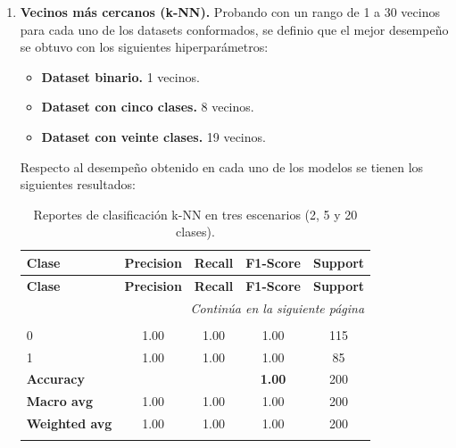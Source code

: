 \documentclass[12pt,a4paper]{article}
\begin{document}
\begin{enumerate}

  \item \textbf{Vecinos más cercanos (k-NN).}
  Probando con un rango de 1 a 30 vecinos para cada uno de los datasets conformados, se definio que el mejor desempeño se obtuvo 
  con los siguientes hiperparámetros:

  \begin{itemize}
    \item \textbf{Dataset binario.} 1 vecinos.
    \item \textbf{Dataset con cinco clases.} 8 vecinos.
    \item \textbf{Dataset con veinte clases.} 19 vecinos.
  \end{itemize}

  Respecto al desempeño obtenido en cada uno de los modelos se tienen los siguientes resultados:

  \small
  \setlength{\tabcolsep}{4pt}
  \begin{longtable}{@{}lcccc@{}}
    \toprule
    \textbf{Clase} & \textbf{Precision} & \textbf{Recall} & \textbf{F1-Score} & \textbf{Support} \\
    \midrule
    \endfirsthead

    \toprule
    \textbf{Clase} & \textbf{Precision} & \textbf{Recall} & \textbf{F1-Score} & \textbf{Support} \\
    \midrule
    \endhead

    \midrule
    \multicolumn{5}{r}{\emph{Continúa en la siguiente página}} \\
    \endfoot

    \bottomrule
    \caption{Reportes de clasificación k-NN en tres escenarios (2, 5 y 20 clases).}
    \label{tab:reportes_clasificacion_knn_long}
    \endlastfoot

    \multicolumn{5}{@{}l}{\textbf{(a) 2 clases}}\\
    0 & 1.00 & 1.00 & 1.00 & 115 \\
    1 & 1.00 & 1.00 & 1.00 & 85 \\
    \midrule
    \multicolumn{3}{l}{\textbf{Accuracy}} & \textbf{1.00} & 200 \\
    \textbf{Macro avg}    & 1.00 & 1.00 & 1.00 & 200 \\
    \textbf{Weighted avg} & 1.00 & 1.00 & 1.00 & 200 \\
    \addlinespace[0.8em]


\end{longtable}
\end{enumerate}
\end{document}
